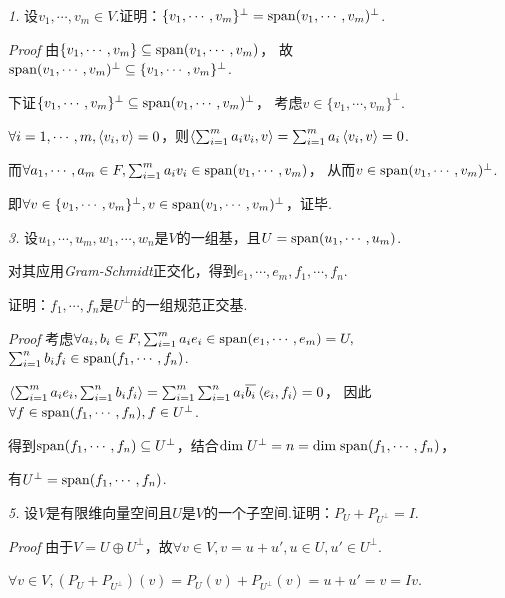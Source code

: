 \textit{1.}
设\(v_1,\cdots,v_m \in V\).证明：\(\{v_1,\cdots,v_m\}^\bot=\mathrm{span}(v_1,\cdots,v_m)^\bot\).

\textit{Proof}
由\(\{v_1,\cdots,v_m\} \subseteq \mathrm{span}(v_1,\cdots,v_m)\)，
故\(\mathrm{span}(v_1,\cdots,v_m)^\bot \subseteq \{v_1,\cdots,v_m\}^\bot\).

下证\(\{v_1,\cdots,v_m\}^\bot \subseteq \mathrm{span}(v_1,\cdots,v_m)^\bot\)，
考虑\(v \in \{v_1,\cdots,v_m\}^\bot\).

\(\forall i=1,\cdots,m,\left\langle v_i,v \right\rangle=0\)，则\(\left\langle \sum_{i=1}^m a_iv_i,v \right\rangle=\sum_{i=1}^m a_i\left\langle v_i,v \right\rangle=0\).

而\(\forall a_1,\cdots,a_m \in F,\sum_{i=1}^m a_iv_i \in \mathrm{span}(v_1,\cdots,v_m)\)，
从而\(v \in \mathrm{span}(v_1,\cdots,v_m)^\bot\).

即\(\forall v \in \{v_1,\cdots,v_m\}^\bot,v \in \mathrm{span}(v_1,\cdots,v_m)^\bot\)，证毕.

\hspace*{\fill}

\textit{3.}
设\(u_1,\cdots,u_m,w_1,\cdots,w_n\)是\(V\)的一组基，且\(U=\mathrm{span}(u_1,\cdots,u_m)\).

对其应用\textit{Gram-Schmidt}{\kaishu 正交化}，得到\(e_1,\cdots,e_m,f_1,\cdots,f_n\).

证明：\(f_1,\cdots,f_n\)是\(U^\bot\)的一组规范正交基.

\textit{Proof}
考虑\(\forall a_i,b_i \in F,\sum_{i=1}^m a_ie_i \in \mathrm{span}(e_1,\cdots,e_m)=U,\)
\(\sum_{i=1}^n b_if_i \in \mathrm{span}(f_1,\cdots,f_n)\).

\(\left\langle \sum_{i=1}^m a_ie_i,\sum_{i=1}^n b_if_i \right\rangle=\sum_{i=1}^m \sum_{i=1}^n a_i\overline{b_i} \left\langle e_i,f_i \right\rangle=0\)，
因此\(\forall f \in \mathrm{span}(f_1,\cdots,f_n), f\in U^\bot\).

得到\(\mathrm{span}(f_1,\cdots,f_n) \subseteq U^\bot\)，结合\(\mathrm{dim \;} U^\bot=n=\mathrm{dim \;} \mathrm{span}(f_1,\cdots,f_n)\)，

有\(U^\bot=\mathrm{span}(f_1,\cdots,f_n)\).

\hspace*{\fill}

\textit{5.}
设\(V\)是有限维向量空间且\(U\)是\(V\)的一个子空间.证明：\(P_U+P_{U^\bot}=I\).

\textit{Proof}
由于\(V=U \oplus U^\bot\)，故\(\forall v \in V,v=u+u',u \in U,u' \in U^\bot\).

\(\forall v \in V,(P_U+P_{U^\bot})(v)=P_U(v)+P_{U^\bot}(v)=u+u'=v=Iv\).

\hspace*{\fill}



